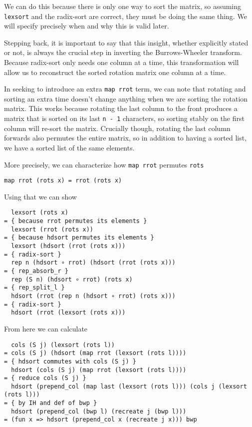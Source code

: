 \documentclass[11pt]{article}
\begin{document}
We can do this because there is only one way to sort the matrix, so
assuming \verb|lexsort| and the radix-sort are correct, they must be
doing the same thing. We will specify precisely when and why this is
valid later.

Stepping back, it is important to say that this insight, whether
explicitly stated or not, is always the crucial step in inverting the
Burrows-Wheeler transform. Because radix-sort only needs one column at
a time, this transformation will allow us to reconstruct the sorted
rotation matrix one column at a time.

In seeking to introduce an extra \verb|map rrot| term, we can note
that rotating and sorting an extra time doesn't change anything when
we are sorting the rotation matrix. This works because rotating the
last column to the front produces a matrix that is sorted on its last
\verb|n - 1| characters, so sorting stably on the first column will
re-sort the matrix. Crucially though, rotating the last column
forwards also permutes the entire matrix, so in addition to having a
sorted list, we have a sorted list of the same elements.

More precisely, we can characterize how \verb|map rrot| permutes
\verb|rots|
\begin{verbatim}
map rrot (rots x) = rrot (rots x)
\end{verbatim}

Using that we can show
\begin{verbatim}
  lexsort (rots x)
= { because rrot permutes its elements }
  lexsort (rrot (rots x))
= { because hdsort permutes its elements }
  lexsort (hdsort (rrot (rots x)))
= { radix-sort }
  rep n (hdsort ∘ rrot) (hdsort (rrot (rots x)))
= { rep_absorb_r }
  rep (S n) (hdsort ∘ rrot) (rots x)
= { rep_split_l }
  hdsort (rrot (rep n (hdsort ∘ rrot) (rots x)))
= { radix-sort }
  hdsort (rrot (lexsort (rots x)))
\end{verbatim}

From here we can calculate
\begin{verbatim}
  cols (S j) (lexsort (rots l))
= cols (S j) (hdsort (map rrot (lexsort (rots l))))
= { hdsort commutes with cols (S j) }
  hdsort (cols (S j) (map rrot (lexsort (rots l))))
= { reduce cols (S j) }
  hdsort (prepend_col (map last (lexsort (rots l))) (cols j (lexsort (rots l)))
= { by IH and def of bwp }
  hdsort (prepend_col (bwp l) (recreate j (bwp l)))
= (fun x => hdsort (prepend_col x (recreate j x))) bwp
\end{verbatim}
\end{document}
